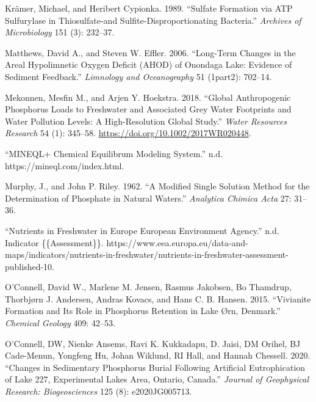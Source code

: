 \documentclass[a4paper,11pt]{article}
\newenvironment{CSLReferences}%
  {}%
  {\par}
\begin{document}
\begin{CSLReferences}{1}{0}
\leavevmode\hypertarget{ref-kramerSulfateFormationATP1989}{}%
Krämer, Michael, and Heribert Cypionka. 1989. {``Sulfate Formation via {ATP} Sulfurylase in Thiosulfate-and Sulfite-Disproportionating Bacteria.''} \emph{Archives of Microbiology} 151 (3): 232--37.

\leavevmode\hypertarget{ref-matthewsLongTermChanges2006}{}%
Matthews, David A., and Steven W. Effler. 2006. {``Long-Term Changes in the Areal Hypolimnetic Oxygen Deficit ({AHOD}) of {Onondaga Lake}: {Evidence} of Sediment Feedback.''} \emph{Limnology and Oceanography} 51 (1part2): 702--14.

\leavevmode\hypertarget{ref-mekonnenGlobalAnthropogenicPhosphorus2018}{}%
Mekonnen, Mesfin M., and Arjen Y. Hoekstra. 2018. {``Global {Anthropogenic Phosphorus Loads} to {Freshwater} and {Associated Grey Water Footprints} and {Water Pollution Levels}: {A High}-{Resolution Global Study}.''} \emph{Water Resources Research} 54 (1): 345--58. \url{https://doi.org/10.1002/2017WR020448}.

\leavevmode\hypertarget{ref-MINEQLChemicalEquilibrum}{}%
{``{MINEQL}+ {Chemical Equilibrum Modeling System}.''} n.d. https://mineql.com/index.html.

\leavevmode\hypertarget{ref-murphyModifiedSingleSolution1962}{}%
Murphy, J., and John P. Riley. 1962. {``A Modified Single Solution Method for the Determination of Phosphate in Natural Waters.''} \emph{Analytica Chimica Acta} 27: 31--36.

\leavevmode\hypertarget{ref-NutrientsFreshwaterEurope}{}%
{``Nutrients in Freshwater in {Europe} {} {European Environment Agency}.''} n.d. Indicator \{\{Assessment\}\}. https://www.eea.europa.eu/data-and-maps/indicators/nutrients-in-freshwater/nutrients-in-freshwater-assessment-published-10.

\leavevmode\hypertarget{ref-oconnellVivianiteFormationIts2015}{}%
O'Connell, David W., Marlene M. Jensen, Rasmus Jakobsen, Bo Thamdrup, Thorbjørn J. Andersen, Andras Kovacs, and Hans C. B. Hansen. 2015. {``Vivianite Formation and Its Role in Phosphorus Retention in {Lake Ørn}, {Denmark}.''} \emph{Chemical Geology} 409: 42--53.

\leavevmode\hypertarget{ref-oconnellChangesSedimentaryPhosphorus2020}{}%
O'Connell, DW, Nienke Ansems, Ravi K. Kukkadapu, D. Jaisi, DM Orihel, BJ Cade-Menun, Yongfeng Hu, Johan Wiklund, RI Hall, and Hannah Chessell. 2020. {``Changes in Sedimentary Phosphorus Burial Following Artificial Eutrophication of {Lake} 227, {Experimental Lakes Area}, {Ontario}, {Canada}.''} \emph{Journal of Geophysical Research: Biogeosciences} 125 (8): e2020JG005713.


\end{CSLReferences}
\end{document}
